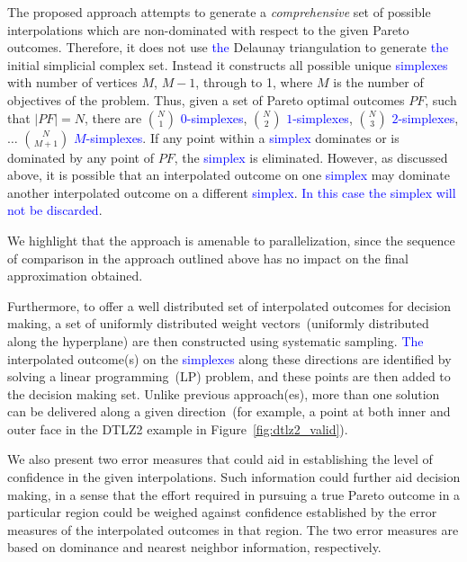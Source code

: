 \begin{enumerate}
	
	\item The proposed approach attempts to generate a \textit{comprehensive} set of possible interpolations which are non-dominated with respect to the given Pareto outcomes. Therefore, it does not use \textcolor{blue}{the} Delaunay triangulation to generate \textcolor{blue}{the} initial simplicial complex set. Instead it constructs all possible unique \textcolor{blue}{simplexes} with number of vertices $M$, $M-1$, through to 1, where $M$ is the number of objectives of the problem. Thus, given a set of Pareto optimal outcomes $PF$, such that $|PF|=N$,  there are $N\choose 1$ \textcolor{blue}{$0$-simplexes}, $N\choose 2$ \textcolor{blue}{$1$-simplexes}, $N\choose 3$ \textcolor{blue}{$2$-simplexes}, $\ldots$ $N\choose {M+1}$ \textcolor{blue}{$M$-simplexes}.  If any point within a \textcolor{blue}{simplex} dominates or is dominated by any point of $PF$, the \textcolor{blue}{simplex} is eliminated. However, as discussed above, it is possible that an interpolated outcome on one \textcolor{blue}{simplex} may dominate another interpolated outcome on a different \textcolor{blue}{simplex}. \textcolor{blue}{In this case the simplex will not be discarded}. 
	
	\item We highlight that the approach is amenable to parallelization, since the sequence of comparison in the approach outlined above has no impact on the final approximation obtained. 
	
	\item Furthermore, to offer a well distributed set of interpolated outcomes for decision making, a set of uniformly distributed weight vectors~(uniformly distributed along the hyperplane) are then constructed using systematic sampling. \textcolor{blue}{The} interpolated outcome(s) on the \textcolor{blue}{simplexes} along these directions are identified by solving a linear programming~(LP) problem, and these points are then added to the decision making set. Unlike previous approach(es), more than one solution can be delivered along a given direction~(for example, a point at both inner and outer face in the DTLZ2 example in Figure~\ref{fig:dtlz2_valid}). 
	{\color{blue}
		\item We also present two error measures that could aid in establishing the level of confidence in the given interpolations. Such information could further aid decision making, in a sense that the effort required in pursuing a true Pareto outcome in a particular region could be weighed against confidence established by the error measures of the interpolated outcomes in that region. The two error measures are based on dominance and nearest neighbor information, respectively.  
		
	}
\end{enumerate}

